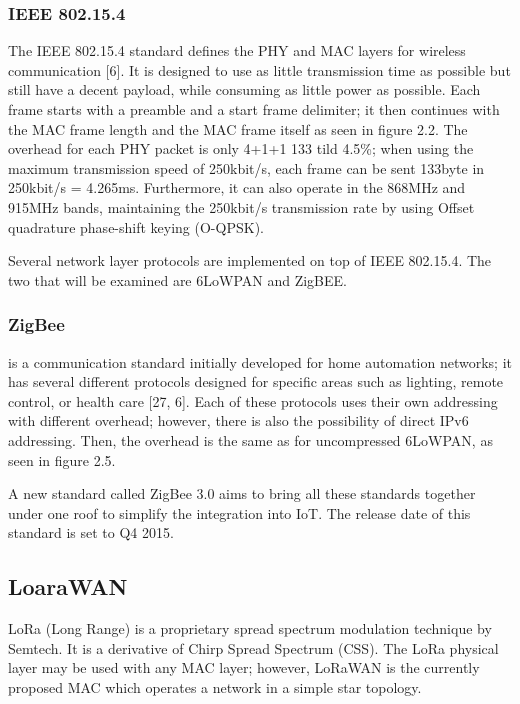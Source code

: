\subsubsection*{IEEE 802.15.4}
The IEEE 802.15.4 standard defines the PHY and MAC layers for wireless communication [6].
It is designed to use as little transmission time as possible but still have a decent payload,
	while consuming as little power as possible.
Each frame starts with a preamble and a start frame delimiter;
	it then continues with the MAC frame length and the MAC frame itself as seen in figure 2.2.
The overhead for each PHY packet is only 4+1+1 133 tild 4.5\%;
	when
using the maximum transmission speed of 250kbit/s,
	each frame can be sent 133byte in 250kbit/s = 4.265ms.
Furthermore,
	it can also operate in the 868MHz and 915MHz bands,
	maintaining the 250kbit/s transmission rate by using Offset quadrature phase-shift keying (O-QPSK).

Several network layer protocols are implemented on top of IEEE 802.15.4.
The two that will be examined are 6LoWPAN and ZigBEE.

\subsubsection{ZigBee} 
is a communication standard initially developed for home automation
networks; it has several different protocols designed for specific areas such
as lighting, remote control, or health care [27, 6]. Each of these protocols
uses their own addressing with different overhead; however, there is also the
possibility of direct IPv6 addressing. Then, the overhead is the same as for
uncompressed 6LoWPAN, as seen in figure 2.5.

A new standard called ZigBee 3.0 aims to bring all these standards together under one roof to simplify the integration into IoT.
The release date of this standard is set to Q4 2015.

\subsection{LoaraWAN}


LoRa (Long Range) is a proprietary spread spectrum modulation technique by Semtech.
It is a derivative of Chirp Spread Spectrum (CSS).
The LoRa physical layer may be used with any MAC layer;
	however,
	LoRaWAN is the currently proposed MAC which operates a network in a simple star topology.

